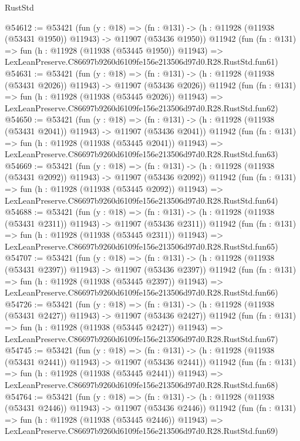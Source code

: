 \begin{lexlean}{RustStd}
\begin{coremodule}
@54612 := @53421
    (fun (y : @18) =>
    (fn : @131) -> (h : @11928 (@11938 (@53431 @1950)) @11943) -> @11907 (@53436 @1950))
    @11942
    (fun (fn : @131) =>
    fun (h : @11928 (@11938 (@53445 @1950)) @11943) =>
    LexLeanPreserve.C86697b9260d6109fe156e213506d97d0.R28.RustStd.fun61)
@54631 := @53421
    (fun (y : @18) =>
    (fn : @131) -> (h : @11928 (@11938 (@53431 @2026)) @11943) -> @11907 (@53436 @2026))
    @11942
    (fun (fn : @131) =>
    fun (h : @11928 (@11938 (@53445 @2026)) @11943) =>
    LexLeanPreserve.C86697b9260d6109fe156e213506d97d0.R28.RustStd.fun62)
@54650 := @53421
    (fun (y : @18) =>
    (fn : @131) -> (h : @11928 (@11938 (@53431 @2041)) @11943) -> @11907 (@53436 @2041))
    @11942
    (fun (fn : @131) =>
    fun (h : @11928 (@11938 (@53445 @2041)) @11943) =>
    LexLeanPreserve.C86697b9260d6109fe156e213506d97d0.R28.RustStd.fun63)
@54669 := @53421
    (fun (y : @18) =>
    (fn : @131) -> (h : @11928 (@11938 (@53431 @2092)) @11943) -> @11907 (@53436 @2092))
    @11942
    (fun (fn : @131) =>
    fun (h : @11928 (@11938 (@53445 @2092)) @11943) =>
    LexLeanPreserve.C86697b9260d6109fe156e213506d97d0.R28.RustStd.fun64)
@54688 := @53421
    (fun (y : @18) =>
    (fn : @131) -> (h : @11928 (@11938 (@53431 @2311)) @11943) -> @11907 (@53436 @2311))
    @11942
    (fun (fn : @131) =>
    fun (h : @11928 (@11938 (@53445 @2311)) @11943) =>
    LexLeanPreserve.C86697b9260d6109fe156e213506d97d0.R28.RustStd.fun65)
@54707 := @53421
    (fun (y : @18) =>
    (fn : @131) -> (h : @11928 (@11938 (@53431 @2397)) @11943) -> @11907 (@53436 @2397))
    @11942
    (fun (fn : @131) =>
    fun (h : @11928 (@11938 (@53445 @2397)) @11943) =>
    LexLeanPreserve.C86697b9260d6109fe156e213506d97d0.R28.RustStd.fun66)
@54726 := @53421
    (fun (y : @18) =>
    (fn : @131) -> (h : @11928 (@11938 (@53431 @2427)) @11943) -> @11907 (@53436 @2427))
    @11942
    (fun (fn : @131) =>
    fun (h : @11928 (@11938 (@53445 @2427)) @11943) =>
    LexLeanPreserve.C86697b9260d6109fe156e213506d97d0.R28.RustStd.fun67)
@54745 := @53421
    (fun (y : @18) =>
    (fn : @131) -> (h : @11928 (@11938 (@53431 @2441)) @11943) -> @11907 (@53436 @2441))
    @11942
    (fun (fn : @131) =>
    fun (h : @11928 (@11938 (@53445 @2441)) @11943) =>
    LexLeanPreserve.C86697b9260d6109fe156e213506d97d0.R28.RustStd.fun68)
@54764 := @53421
    (fun (y : @18) =>
    (fn : @131) -> (h : @11928 (@11938 (@53431 @2446)) @11943) -> @11907 (@53436 @2446))
    @11942
    (fun (fn : @131) =>
    fun (h : @11928 (@11938 (@53445 @2446)) @11943) =>
    LexLeanPreserve.C86697b9260d6109fe156e213506d97d0.R28.RustStd.fun69)

\end{coremodule}
\end{lexlean}
